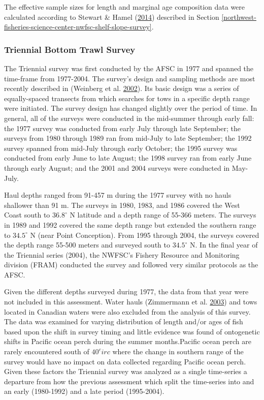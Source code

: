\documentclass[12pt,]{article}
\begin{document}
The effective sample sizes for length and marginal age composition data
were calculated according to Stewart \& Hamel
(\protect\hyperlink{ref-stewart_bootstrapping_2014}{2014}) described in
Section
\ref{northwest-fisheries-science-center-nwfsc-shelf-slope-survey}.

\subsubsection{Triennial Bottom Trawl
Survey}\label{triennial-bottom-trawl-survey}

The Triennial survey was first conducted by the AFSC in 1977 and spanned
the time-frame from 1977-2004. The survey's design and sampling methods
are most recently described in (Weinberg et al.
\protect\hyperlink{ref-weinberg_estimation_2002}{2002}). Its basic
design was a series of equally-spaced transects from which searches for
tows in a specific depth range were initiated. The survey design has
changed slightly over the period of time. In general, all of the surveys
were conducted in the mid-summer through early fall: the 1977 survey was
conducted from early July through late September; the surveys from 1980
through 1989 ran from mid-July to late September; the 1992 survey
spanned from mid-July through early October; the 1995 survey was
conducted from early June to late August; the 1998 survey ran from early
June through early August; and the 2001 and 2004 surveys were conducted
in May-July.

Haul depths ranged from 91-457 m during the 1977 survey with no hauls
shallower than 91 m. The surveys in 1980, 1983, and 1986 covered the
West Coast south to \(36.8^\circ\) N latitude and a depth range of
55-366 meters. The surveys in 1989 and 1992 covered the same depth range
but extended the southern range to \(34.5^\circ\) N (near Point
Conception). From 1995 through 2004, the surveys covered the depth range
55-500 meters and surveyed south to \(34.5^\circ\) N. In the final year
of the Triennial series (2004), the NWFSC's Fishery Resource and
Monitoring division (FRAM) conducted the survey and followed very
similar protocols as the AFSC.

Given the different depths surveyed during 1977, the data from that year
were not included in this assessment. Water hauls (Zimmermann et al.
\protect\hyperlink{ref-zimmermann_influence_2003}{2003}) and tows
located in Canadian waters were also excluded from the analysis of this
survey. The data was examined for varying distribution of length and/or
ages of fish based upon the shift in survey timing and little evidence
was found of ontogenetic shifts in Pacific ocean perch during the summer
months.Pacific ocean perch are rarely encountered south of \(40^circ\)
where the change in southern range of the survey would have no impact on
data collected regarding Pacific ocean perch. Given these factors the
Triennial survey was analyzed as a single time-series a departure from
how the previous assessment which split the time-series into and an
early (1980-1992) and a late period (1995-2004).
\end{document}
